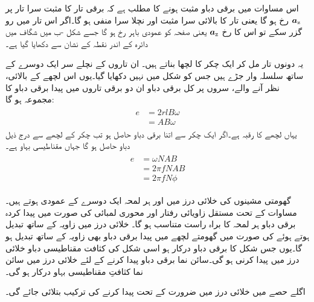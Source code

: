 اس مساوات میں برقی دباو  مثبت ہونے کا مطلب ہے کہ برقی تار کا مثبت سرا تار پر  ${\boldsymbol{a}}_{\textup{z}}$ رخ ہو گا یعنی تار کا بالائی سرا مثبت اور نچلا  سرا منفی ہو گا۔اگر اس تار میں  رو گزر سکے تو اس کا رخ ${\boldsymbol{a}}_{\textup{z}}$ یعنی صفحہ کو عمودی  باہر رخ ہو گا جسے شکل -ب میں  شگاف میں دائرہ کے اندر نقطہ کے نشان سے دکھایا گیا ہے۔ 

یہ دونوں  تار مل کر ایک چکر کا لچھا بناتے ہیں۔ ان تاروں  کے نچلے سر ایک دوسرے کے ساتھ سلسلہ وار جڑے ہیں جس کو شکل  میں نہیں دکھایا گیا۔یوں اس لچھے کے بالائی،  نظر آنے والے،  سروں پر کل برقی دباو  ان دو برقی تاروں میں پیدا برقی دباو  کا مجموعہ ہو گا:
\begin{gather}
\begin{aligned}
e&=2r l B \omega\\
&=A B \omega
\end{aligned}
\end{gather}
یہاں لچھے کا رقبہ   ہے۔اگر ایک چکر سے اتنا برقی دباو حاصل ہو تب  چکر کے لچھے  سے درج ذیل دباو حاصل ہو گا جہاں  مقناطیسی بہاو ہے۔
\begin{gather}
\begin{aligned}\label{مساوات_گھومتے_مشین_پیدا_دباو}
e&=\omega N A B\\
&=2 \pi f N A B\\
&=2 \pi f N \phi
\end{aligned}
\end{gather}

گھومتی مشینوں کی خلائی درز میں   اور   ہر لمحہ ایک دوسرے کے عمودی ہوتے ہیں۔مساوات   کے تحت مستقل زاویائی  رفتار اور محوری لمبائی کی صورت میں پیدا کردہ برقی دباو  ہر لمحہ   کا براہ راست متناسب ہو گا۔ خلائی درز میں زاویہ کے ساتھ  تبدیل ہوتے ہوئے  کی صورت میں گھومتے لچھے میں پیدا برقی دباو بھی زاویہ کے ساتھ تبدیل ہو گا۔یوں جس شکل کا برقی دباو درکار ہو اسی شکل کی کثافت مقناطیسی دباو خلائی درز میں پیدا کرنی ہو گی۔سائن نما برقی دباو پیدا کرنے کے لئے   خلائی درز میں  سائن نما کثافتِ مقناطیسی بہاو درکار ہو گی۔

اگلے حصے میں خلائی درز میں ضرورت کے تحت   پیدا کرنے کی ترکیب بتلائی جائے گی۔

